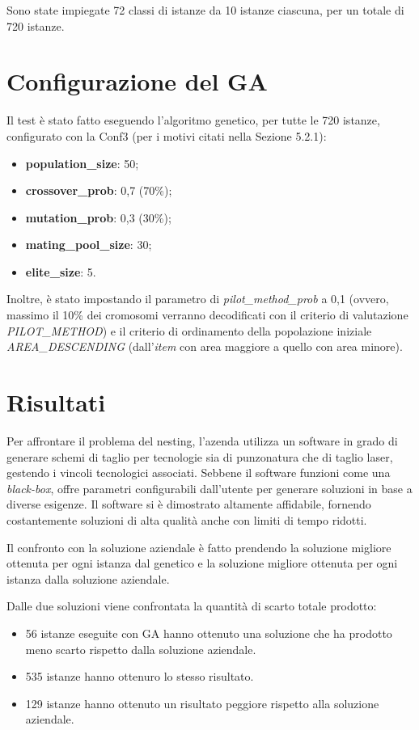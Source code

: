 Sono state impiegate 72 classi di istanze da 10 istanze ciascuna, per un totale di 720 istanze.

\section{Configurazione del GA}

Il test è stato fatto eseguendo l'algoritmo genetico, per tutte le 720 istanze, configurato con la Conf3 (per i motivi citati nella Sezione 5.2.1):
\begin{itemize}
    \item\textbf{population\_size}: 50;
	\item\textbf{crossover\_prob}: 0,7 (70\%);
	\item\textbf{mutation\_prob}: 0,3 (30\%);
	\item\textbf{mating\_pool\_size}: 30;
	\item\textbf{elite\_size}: 5.
\end{itemize}
Inoltre, è stato impostando il parametro di \emph{pilot\_method\_prob} a 0,1 (ovvero, massimo il 10\% dei cromosomi verranno decodificati con il criterio di valutazione \emph{PILOT\_METHOD}) e il criterio di ordinamento della popolazione iniziale \emph{AREA\_DESCENDING} (dall'\emph{item} con area maggiore a quello con area minore).

\section{Risultati}

Per affrontare il problema del nesting, l'azenda utilizza un software in grado di generare schemi di taglio per tecnologie sia di punzonatura che di taglio laser, gestendo i vincoli tecnologici associati. Sebbene il software funzioni come una \emph{black-box}\glsfirstoccur, offre parametri configurabili dall'utente per generare soluzioni in base a diverse esigenze. Il software si è dimostrato altamente affidabile, fornendo costantemente soluzioni di alta qualità anche con limiti di tempo ridotti.

Il confronto con la soluzione aziendale è fatto prendendo la soluzione migliore ottenuta per ogni istanza dal genetico e la soluzione migliore ottenuta per ogni istanza dalla soluzione aziendale.

Dalle due soluzioni viene confrontata la quantità di scarto totale prodotto:
\begin{itemize}
    \item 56 istanze eseguite con GA hanno ottenuto una soluzione che ha prodotto meno scarto rispetto dalla soluzione aziendale.
    \item 535 istanze hanno ottenuro lo stesso risultato.
    \item 129 istanze hanno ottenuto un risultato peggiore rispetto alla soluzione aziendale.
\end{itemize}

